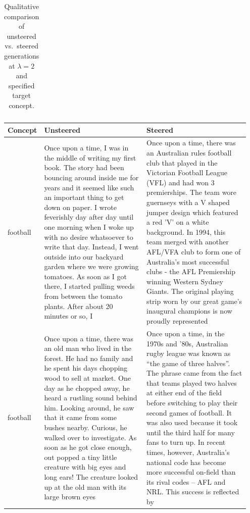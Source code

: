 \documentclass{article}
\theoremstyle{plain}
\theoremstyle{definition}
\theoremstyle{remark}
\begin{document}
\begin{table}[t]
\begin{tabular}{p{0.05\linewidth} p{0.45\linewidth} p{0.45\linewidth}}
\bottomrule
\end{tabular}
\caption{Qualitative comparison of unsteered vs.\ steered generations at $\lambda = 2$ and specified target concept.}
\label{ap:tab:qualitative-examples}
\end{table}



\begin{table}[t]
\centering
\small
\setlength{\tabcolsep}{6pt}
\begin{tabular}{p{0.05\linewidth} p{0.45\linewidth} p{0.45\linewidth}}
\toprule
\textbf{Concept} & \textbf{Unsteered} & \textbf{Steered} \\
\midrule
football & Once upon a time, I was in the middle of writing my first book. The story had been bouncing around inside me for years and it seemed like such an important thing to get down on paper.
I wrote feverishly day after day until one morning when I woke up with no desire whatsoever to write that day. Instead, I went outside into our backyard garden where we were growing tomatoes. As soon as I got there, I started pulling weeds from between the tomato plants. After about 20 minutes or so, I & Once upon a time, there was an Australian rules football club that played in the Victorian Football League (VFL) and had won 3 premierships. The team wore guernseys with a V shaped jumper design which featured a red 'V' on a white background.
In 1994, this team merged with another AFL/VFA club to form one of Australia's most successful clubs - the AFL Premiership winning Western Sydney Giants.
The original playing strip worn by our great game's inaugural champions is now proudly represented \\
\addlinespace
football & Once upon a time, there was an old man who lived in the forest. He had no family and he spent his days chopping wood to sell at market.
One day as he chopped away, he heard a rustling sound behind him. Looking around, he saw that it came from some bushes nearby. Curious, he walked over to investigate. As soon as he got close enough, out popped a tiny little creature with big eyes and long ears!
The creature looked up at the old man with its large brown eyes & Once upon a time, in the 1970s and ’80s, Australian rugby league was known as “the game of three halves”. The phrase came from the fact that teams played two halves at either end of the field before switching to play their second games of football. It was also used because it took until the third half for many fans to turn up.
In recent times, however, Australia’s national code has become more successful on-field than its rival codes – AFL and NRL. This success is reflected by \\

\end{tabular}
\end{table}
\end{document}
